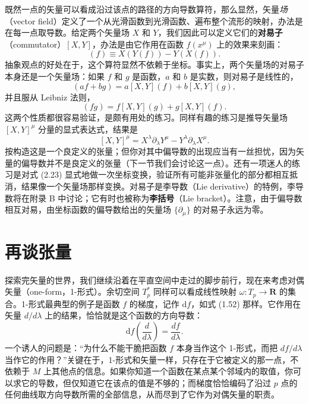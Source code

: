既然一点的矢量可以看成沿过该点的路径的方向导数算符，那么显然，矢量\emph{场}（vector field）定义了一个从光滑函数到光滑函数、遍布整个流形的映射，办法是在每一点取导数。给定两个矢量场 $X$ 和 $Y$，我们因此可以定义它们的\textbf{对易子}（commutator）$[X,Y]$，办法是由它作用在函数 $f(x^\mu)$ 上的效果来刻画：
\begin{equation*}
[X,Y](f)\equiv X(Y(f))-Y(X(f)). \tag{2.20}
\end{equation*}
抽象观点的好处在于，这个算符显然不依赖于坐标。事实上，两个矢量场的对易子本身还是一个矢量场：如果 $f$ 和 $g$ 是函数，$a$ 和 $b$ 是实数，则对易子是线性的，
\begin{equation*}
[X,Y](af+bg)=a[X,Y](f)+b[X,Y](g), \tag{2.21}
\end{equation*}
并且服从 Leibniz 法则，
\begin{equation*}
[X,Y](fg)=f[X,Y](g)+g[X,Y](f). \tag{2.22}
\end{equation*}
这两个性质都很容易验证，是颇有用处的练习。同样有趣的练习是推导矢量场 $[X,Y]^\mu$ 分量的显式表达式，结果是
\begin{equation*}
\boxed{[X,Y]^\mu=X^\lambda\partial_\lambda Y^\mu-Y^\lambda\partial_\lambda X^\mu}. \tag{2.23}
\end{equation*}
按构造这是一个良定义的张量；但你对其中偏导数的出现应当有一丝担忧，因为矢量的偏导数并不是良定义的张量（下一节我们会讨论这一点）。还有一项迷人的练习是对式 (2.23) 显式地做一次坐标变换，验证所有可能非张量化的部分都相互抵消，结果像一个矢量场那样变换。对易子是李导数（Lie derivative）的特例，李导数将在附录 B 中讨论；它有时也被称为\textbf{李括号}（Lie bracket）。注意，由于偏导数相互对易，由坐标函数的偏导数给出的矢量场 $\{\partial_\mu\}$ 的对易子永远为零。

\section{再谈张量}

探索完矢量的世界，我们继续沿着在平直空间中走过的脚步前行，现在来考虑对偶矢量（one-form，1-形式）。余切空间 $T_p^*$ 同样可以看成线性映射 $\omega:T_p\to\mathbf{R}$ 的集合。1-形式最典型的例子是函数 $f$ 的梯度，记作 $\mathrm{d}f$，如式 (1.52) 那样。它作用在矢量 $d/d\lambda$ 上的结果，恰恰就是这个函数的方向导数：
\begin{equation*}
\mathrm{d}f\left(\frac{d}{d\lambda}\right)=\frac{df}{d\lambda}. \tag{2.24}
\end{equation*}
一个诱人的问题是：“为什么不能干脆把函数 $f$ 本身当作这个 1-形式，而把 $df/d\lambda$ 当作它的作用？”关键在于，1-形式和矢量一样，只存在于它被定义的那一点，不依赖于 $M$ 上其他点的信息。如果你知道一个函数在某点某个邻域内的取值，你可以求它的导数，但仅知道它在该点的值是不够的；而梯度恰恰编码了沿过 $p$ 点的任何曲线取方向导数所需的全部信息，从而尽到了它作为对偶矢量的职责。

